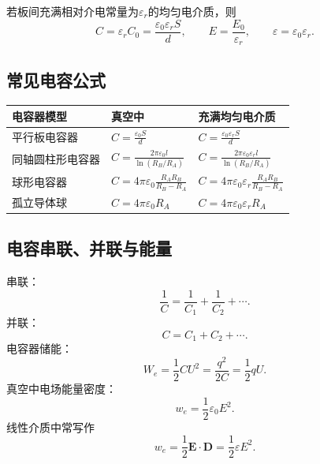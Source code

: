 \documentclass[UTF8,zihao=-4]{ctexart}
\newcommand{\eps}{\varepsilon}
\newcommand{\epsz}{\varepsilon_0}
\newcommand{\ve}[1]{\bm{#1}}
\newcommand{\E}{\ve E}
\newcommand{\D}{\ve D}
\begin{document}
若板间充满相对介电常量为\(\eps_r\)的均匀电介质，则
\begin{equation}
\boxed{C=\eps_r C_0=\frac{\epsz\eps_r S}{d}},
\qquad
\boxed{E=\frac{E_0}{\eps_r}},
\qquad
\boxed{\eps=\epsz\eps_r}.
\end{equation}

\subsection{常见电容公式}

\begin{longtable}{>{\raggedright\arraybackslash}p{}>{\raggedright\arraybackslash}p{}>{\raggedright\arraybackslash}p{}}
\toprule
\textbf{电容器模型} & \textbf{真空中} & \textbf{充满均匀电介质} \\
\midrule
平行板电容器 & \(\displaystyle C=\frac{\epsz S}{d}\) & \(\displaystyle C=\frac{\epsz\eps_r S}{d}\) \\
同轴圆柱形电容器 & \(\displaystyle C=\frac{2\pi\epsz l}{\ln(R_B/R_A)}\) & \(\displaystyle C=\frac{2\pi\epsz\eps_r l}{\ln(R_B/R_A)}\) \\
球形电容器 & \(\displaystyle C=4\pi\epsz\frac{R_A R_B}{R_B-R_A}\) & \(\displaystyle C=4\pi\epsz\eps_r\frac{R_A R_B}{R_B-R_A}\) \\
孤立导体球 & \(\displaystyle C=4\pi\epsz R_A\) & \(\displaystyle C=4\pi\epsz\eps_r R_A\) \\
\bottomrule
\end{longtable}

\subsection{电容串联、并联与能量}

串联：
\begin{equation}
\frac{1}{C}=\frac{1}{C_1}+\frac{1}{C_2}+\cdots.
\end{equation}
并联：
\begin{equation}
C=C_1+C_2+\cdots.
\end{equation}
电容器储能：
\begin{equation}
W_e=\frac12 CU^2=\frac{q^2}{2C}=\frac12 qU.
\end{equation}
真空中电场能量密度：
\begin{equation}
w_e=\frac12\epsz E^2.
\end{equation}
线性介质中常写作
\begin{equation}
w_e=\frac12 \E\cdot\D=\frac12\eps E^2.
\end{equation}
\end{document}
